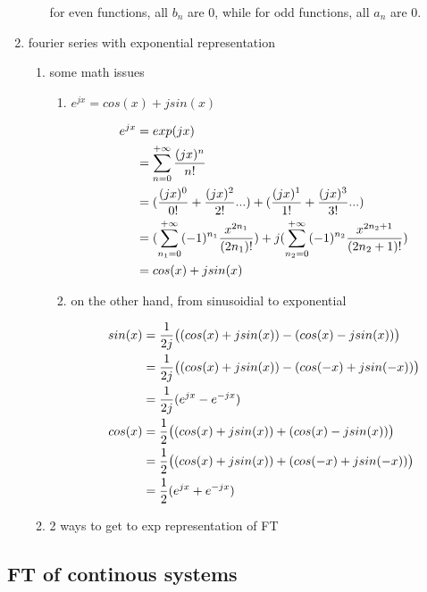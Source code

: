 \documentclass[11pt]{article}
\begin{document}
\begin{enumerate}
\begin{enumerate}
for even functions, all \(b_n\) are 0, while for odd functions, all \(a_n\) are 0.
\end{enumerate}
\item fourier series with exponential representation
\label{sec:org2fbf3c4}
\begin{enumerate}
\item some math issues
\label{sec:org9e34132}
\begin{enumerate}
\item \(e^{jx} = cos(x) + j sin(x)\)
\label{sec:org200605a}

\begin{align}
  e^{j x} & = exp(j x) \notag \\
          & = \sum_{n = 0}^{+\infty} \frac{(j x)^n}{n!} \notag \\
          & = (\frac{(j x)^0}{0!} + \frac{(j x)^2}{2!} ...) + (\frac{(j x)^1}{1!} + \frac{(j x)^3}{3!} ...) \notag \\
          & =
            (\sum_{n_1 = 0}^{+\infty} (-1)^{n_1}\frac{x^{2 n_1}}{(2 n_1)!})
            +
            j(\sum_{n_2 = 0}^{+\infty} (-1)^{n_2}\frac{x^{2 n_2 + 1}}{(2n_2 + 1)!}) \notag \\
          & = cos(x) + j sin(x)
\end{align}
\item on the other hand, from sinusoidial to exponential
\label{sec:orgff09055}

\begin{align}
  sin(x) & = \frac{1}{2 j} \bigl( (cos(x) + j sin(x)) - (cos(x) - j sin(x)) \bigr) \notag \\
         & = \frac{1}{2 j} \bigl( (cos(x) + j sin(x)) - (cos(-x) + j sin(-x)) \bigr) \notag \\
         & = \frac{1}{2 j} (e^{j x} - e^{-j x}) \\
  cos(x) & = \frac{1}{2} \bigl( (cos(x) + j sin(x)) + (cos(x) - j sin(x)) \bigr) \notag \\
         & = \frac{1}{2} \bigl( (cos(x) + j sin(x)) + (cos(-x) + j sin(-x)) \bigr) \notag \\
         & = \frac{1}{2} (e^{j x} + e^{-j x})
\end{align}
\end{enumerate}
\item 2 ways to get to exp representation of FT
\label{sec:orgd400e5e}
\end{enumerate}
\end{enumerate}

\subsection{FT of continous systems}
\label{sec:org6d0ba37}
\end{document}

